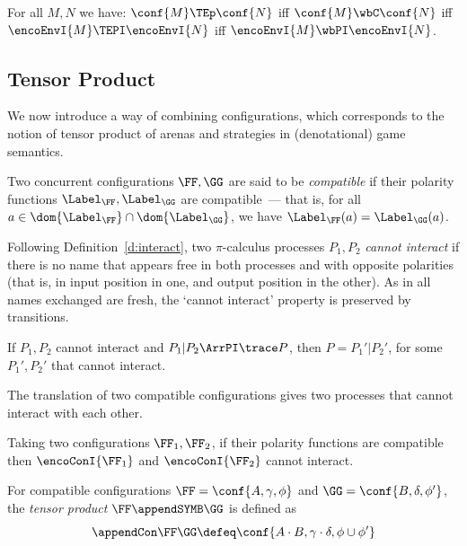 \begin{corollary}
\label{c:fa_all}
For all $M,N$ we have: 
$\conf{M} \TEp \conf {N}$ iff 
$\conf{M} \wbC \conf {N}$ iff 
$\encoEnvI {{M} } \TEPI\encoEnvI {{N}}$
iff 
$\encoEnvI {{M}} \wbPI \encoEnvI {{N}}$. 
\end{corollary} 


\subsection{Tensor Product}
\label{ss:tp}
We now introduce a way of combining configurations, which corresponds to the notion of
tensor product of arenas and strategies in (denotational) game semantics.

\begin{definition}
Two concurrent configurations $\FF,\GG$ are said to be \emph{compatible} if 
their polarity functions  $\Label_{\FF},\Label_{\GG}$ are compatible~--- that is,
for all $a \in \dom{\Label_{\FF}} \cap \dom{\Label_{\GG}}$,
we have $\Label_{\FF}(a) = \Label_{\GG}(a)$.
\end{definition}

\noindent
Following Definition~\ref{d:interact},
two $\pi$-calculus processes $P_1,P_2$ \emph{cannot interact} 
if there is no name that appears free in both processes
and with opposite polarities 
(that is, in input position in one, 
and output position in the other). 
As
 in \piI all names exchanged are fresh, 
the  `cannot interact' property is preserved by transitions.

\begin{lemma}
  \label{l:ci_trans}
If $P_1,P_2$ cannot interact and 
$P_1 | P_2 \ArrPI \trace P $, then $P =  P_1'| P_2'$, for some 
$P_1', P_2'$ that cannot interact.
\end{lemma}
 
\noindent
The \piI translation of
two compatible \COGS configurations gives two processes that 
cannot interact with each other.

\begin{lemma}
  \label{l:compat_cannot-interact}
  Taking two \COGS configurations $\FF_1,\FF_2$,
  if their polarity functions are compatible then $\encoConI {\FF_1}$ and
  $\encoConI {\FF_2}$ cannot interact.
\end{lemma} 


\begin{definition}
  \label{d:tensor_cogs}
For  compatible configurations
$ \FF = \conf{ A , \gamma, \phi }$
and 
$ \GG = \conf{ B , \delta, \phi' }$,  the \emph{tensor product} 
$\FF \appendSYMB \GG$ is  defined as 
\[ \appendCon \FF \GG  \defeq
 \conf{ A \cdot B , \gamma \cdot \delta, \phi \cup \phi' }
 \] 
 \end{definition}

